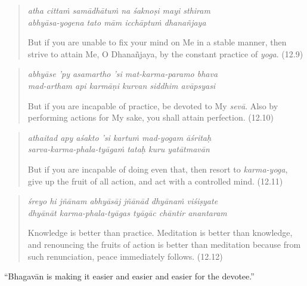 \documentclass[12pt, twoside, openright]{memoir}
\begin{document}
\par
\begin{verse}
\textit{atha cittaṁ samādhātuṁ na śaknoṣi mayi sthiram} \\
\textit{abhyāsa-yogena tato mām icchāptuṁ dhanañjaya}

\noindent But if you are unable to fix your mind on Me in a stable manner, then strive to attain Me, O Dhanañjaya, by the constant practice of \textit{yoga}. (12.9)
\end{verse}
\par



\par
\begin{verse}
\textit{abhyāse ’py asamartho ’si mat-karma-paramo bhava} \\
\textit{mad-artham api karmāṇi kurvan siddhim avāpsyasi}

\noindent But if you are incapable of practice, be devoted to My \textit{sevā}. Also by performing actions for My sake, you shall attain perfection. (12.10)
\end{verse}
\par



\par
\begin{verse}
\textit{athaitad apy aśakto ’si kartuṁ mad-yogam āśritaḥ} \\
\textit{sarva-karma-phala-tyāgaṁ tataḥ kuru yatātmavān}

\noindent But if you are incapable of doing even that, then resort to \textit{karma-yoga}, give up the fruit of all action, and act with a controlled mind. (12.11)
\end{verse}
\par



\par
\begin{verse}
\textit{śreyo hi jñānam abhyāsāj jñānād dhyānaṁ viśiṣyate} \\
\textit{dhyānāt karma-phala-tyāgas tyāgāc chāntir anantaram}

\noindent Knowledge is better than practice. Meditation is better than knowledge, and renouncing the fruits of action is better than meditation because from such renunciation, peace immediately follows. (12.12)
\end{verse}
\par


\enquote{Bhagavān is making it easier and easier and easier for the devotee.}
\end{document}
